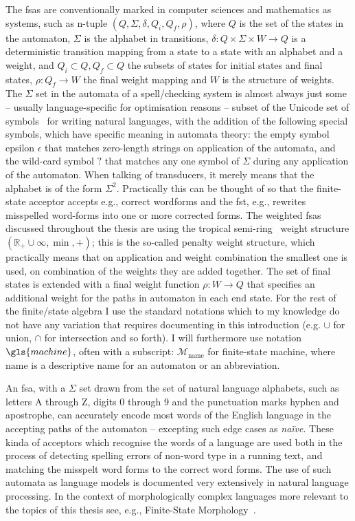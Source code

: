\documentclass[officiallayout,final]{unihelcompling}
\begin{document}
The \glspl{fsa} are conventionally marked in computer sciences and mathematics
as systems, such as n-tuple $(Q, \Sigma, \delta, Q_i, Q_f, \rho)$, where $Q$ is
the set of the states in the automaton, $\Sigma$ is the alphabet in
transitions, $\delta: Q \times \Sigma \times W \rightarrow Q$ is a
deterministic transition mapping from a state to a state with an alphabet and a
weight, and $Q_i \subset Q, Q_f \subset Q$ the subsets of states for initial
states and final states, $\rho: Q_f \rightarrow W$ the final weight mapping and
$W$ is the structure of weights.  The $\Sigma$ set in the automata of a
spell\-/checking system is almost always just some -- usually language-specific
for optimisation reasons -- subset of the Unicode set of symbols~\citep{unicode}
for writing natural languages, with the addition of the following special
symbols, which have specific meaning in automata theory: the empty symbol
epsilon $\epsilon$ that matches zero-length strings on application of the
automata, and the wild-card symbol $?$ that matches any one symbol of $\Sigma$
during any application of the automaton.  When talking of transducers, it
merely means that the alphabet is of the form $\Sigma^2$. Practically this can
be thought of so that the \gls{finite-state acceptor} accepts e.g., correct
wordforms and the \gls{fst}, e.g., rewrites misspelled word-forms into one or
more corrected forms.  The weighted \glspl{fsa} discussed throughout the thesis
are using the \gls{tropical semi-ring}~\citep{mohri1997finitestate} weight
structure $(\mathbb{R}_+ \cup \infty, \min, +)$; this is the so-called penalty
weight structure, which practically means that on application and weight
combination the smallest one is used, on combination of the weights they are
added together. The set of final states is extended with a final weight
function $\rho: W \rightarrow Q$ that specifies an additional weight for the
paths in automaton in each end state. For the rest of the finite\-/state
algebra I use the standard notations which to my knowledge do not have any
variation that requires documenting in this introduction (e.g.  $\cup$ for
union, $\cap$ for intersection and so forth). I will furthermore use notation
$\gls{machine}$, often with a subscript: $\mathcal{M}_\mathrm{name}$ for
finite-state machine, where $\mathrm{name}$ is a descriptive name for an
automaton or an abbreviation.

An \gls{fsa}, with a $\Sigma$ set drawn from the set of natural language
alphabets, such as letters A through Z, digits 0 through 9 and the punctuation
marks hyphen and apostrophe, can accurately encode most words of the English
language in the accepting paths of the automaton -- excepting such edge cases as
\emph{naïve}. These kinda of acceptors which recognise the words of a language
are used both in the process of detecting spelling errors of non-word type in a
running text, and matching the misspelt word forms to the correct word forms.
The use of such automata as language models is documented very extensively in
natural language processing.  In the context of morphologically complex
languages more relevant to the topics of this thesis see, e.g., Finite-State
Morphology~\citep{beesley2003finite,beesley2004morphological}.
\end{document}
